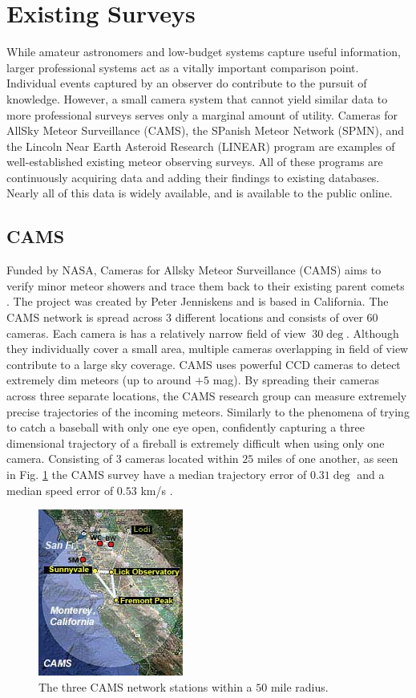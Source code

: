 \section{Existing Surveys}
While amateur astronomers and low-budget systems capture useful information, larger professional systems act as a vitally important comparison point.
Individual events captured by an observer do contribute to the pursuit of knowledge.
However, a small camera system that cannot yield similar data to more professional surveys serves only a marginal amount of utility.
Cameras for AllSky Meteor Surveillance (CAMS), the SPanish Meteor Network (SPMN), and the Lincoln Near Earth Asteroid Research (LINEAR) program are examples of well-established existing meteor observing surveys.  
All of these programs are continuously acquiring data and adding their findings to existing databases.  
Nearly all of this data is widely available, and is available to the public online. 



\subsection{CAMS}
Funded by NASA, Cameras for Allsky Meteor Surveillance (CAMS) aims to verify minor meteor showers and trace them back to their existing parent comets \cite{jenniskens_cams:_2011}.  
The project was created by Peter Jenniskens and is based in California.  
The CAMS network is spread across 3 different locations and consists of over 60 cameras.
Each camera is has a relatively narrow field of view $~30\deg$.
Although they individually cover a small area, multiple cameras overlapping in field of view contribute to a large sky coverage. 
CAMS uses powerful CCD cameras to detect extremely dim meteors (up to around $+5$ mag).
By spreading their cameras across three separate locations, the CAMS research group can measure extremely precise trajectories of the incoming meteors. 
Similarly to the phenomena of trying to catch a baseball with only one eye open, confidently capturing a three dimensional trajectory of a fireball is extremely difficult when using only one camera.
Consisting of $3$ cameras located within $25$ miles of one another, as seen in Fig. \ref{trio} the CAMS survey have a median trajectory error of $0.31\deg$ and a median speed error of $0.53$ km/s \cite{jenniskens_cams:_2011}. 

\begin{figure}[ht!]
  \centering
  \includegraphics[scale=0.7]{images/CAMS_trio.jpg}
  \caption{The three CAMS network stations within a $50$ mile radius.}
  \label{trio}
\end{figure}

